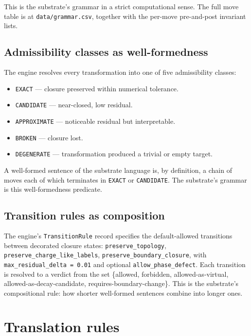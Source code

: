 \documentclass[11pt,a4paper]{article}
\begin{document}
This is the substrate's grammar in a strict computational sense.
The full move table is at \texttt{data/grammar.csv}, together with
the per-move pre-and-post invariant lists.

\subsection{Admissibility classes as well-formedness}
\label{sec:grammar:wellformed}

The engine resolves every transformation into one of five
admissibility classes:

\begin{itemize}[leftmargin=*]
  \item \texttt{EXACT} --- closure preserved within numerical
        tolerance.
  \item \texttt{CANDIDATE} --- near-closed, low residual.
  \item \texttt{APPROXIMATE} --- noticeable residual but
        interpretable.
  \item \texttt{BROKEN} --- closure lost.
  \item \texttt{DEGENERATE} --- transformation produced a trivial
        or empty target.
\end{itemize}

A well-formed sentence of the substrate language is, by
definition, a chain of moves each of which terminates in
\texttt{EXACT} or \texttt{CANDIDATE}. The substrate's grammar is
this well-formedness predicate.

\subsection{Transition rules as composition}
\label{sec:grammar:transitions}

The engine's \texttt{TransitionRule} record specifies the
default-allowed transitions between decorated closure states:
\texttt{preserve\_topology}, \texttt{preserve\_charge\_like\_labels},
\texttt{preserve\_boundary\_closure}, with
\texttt{max\_residual\_delta = 0.01} and optional
\texttt{allow\_phase\_defect}. Each transition is resolved to a
verdict from the set \{allowed, forbidden, allowed-as-virtual,
allowed-as-decay-candidate, requires-boundary-change\}. This is
the substrate's compositional rule: how shorter well-formed
sentences combine into longer ones.

\section{Translation rules}
\label{sec:translation}
\end{document}
